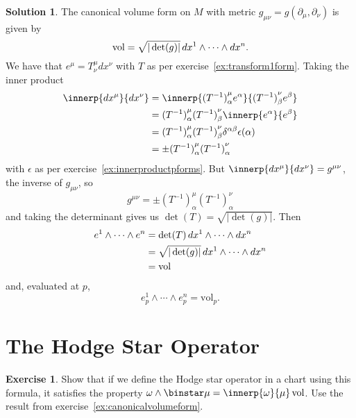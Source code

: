 \documentclass[11pt, a4paper]{report}
\theoremstyle{definition}
\newtheorem{exercise}{Exercise}[part]
\newtheorem{solution}{Solution}[part]
\newenvironment{ex}{\begin{exercise}}{\end{exercise}\pagebreak[1]}
\newenvironment{sol}{\begin{solution}}{\end{solution}\pagebreak[3]}
\newcommand*{\op}[1]{\ensuremath\mathop{}\mathopen{}#1}
\renewcommand*{\d}{\op{d}}
\renewcommand*{\star}{\op{\binstar}\mathord{}}
\begin{document}
\begin{sol}

The canonical volume form on $M$ with metric $g_{\mu\nu} = g(\partial_\mu, \partial_\nu)$ is given by
\[
    \text{vol} = \sqrt{|\det(g)|} \d x^1 \wedge \cdots \wedge dx^n.
\]
We have that $e^\mu = T^\mu_\nu dx^\nu$ with $T$ as per exercise~\ref{ex:transform1form}. Taking the inner product
\begin{align*}
    \innerp{dx^\mu}{dx^\nu} &= \innerp{{(T^{-1})}^\mu_\alpha e^\alpha}{{(T^{-1})}^\nu_\beta e^\beta} \\
        &= {(T^{-1})}^\mu_\alpha {(T^{-1})}^\nu_\beta \innerp{e^\alpha}{e^\beta} \\
        &= {(T^{-1})}^\mu_\alpha {(T^{-1})}^\nu_\beta \delta^{\alpha\beta} \epsilon(\alpha) \\
        &= \pm {(T^{-1})}^\mu_\alpha {(T^{-1})}^\nu_\alpha
\end{align*}
with $\epsilon$ as per exercise~\ref{ex:innerproductpforms}.
But $\innerp{dx^\mu}{dx^\nu} = g^{\mu\nu}$, the inverse of $g_{\mu\nu}$, so
\[
g^{\mu\nu} = \pm {(T^{-1})}^\mu_\alpha {(T^{-1})}^\nu_\alpha
\]
and taking the determinant gives us $\det(T) = \sqrt{|\det(g)|}$. Then
\begin{align*}
    e^1 \wedge \cdots \wedge e^n &= \det(T) \d x^1 \wedge \cdots \wedge dx^n \\
        &= \sqrt{|\det(g)|} \d x^1 \wedge \cdots \wedge dx^n \\
        &= \text{vol}
\end{align*}
and, evaluated at $p$,
\[
e_p^1 \wedge \cdots \wedge e_p^n = \text{vol}_p.
\]

\end{sol}

\section{The Hodge Star Operator}

\begin{ex}

Show that if we define the Hodge star operator in a chart using this formula, it satisfies the property $\omega \wedge \star \mu = \innerp{\omega}{\mu} \, \text{vol}$. Use the result from exercise~\ref{ex:canonicalvolumeform}.

\end{ex}
\end{document}
